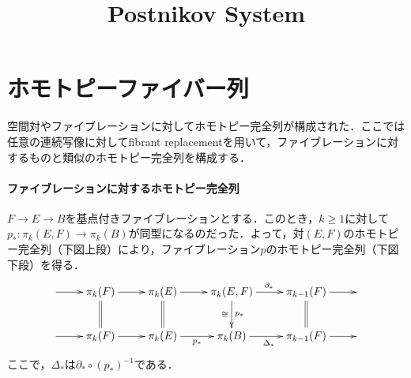 \documentclass[a4paper,11pt]{jsarticle}
\theoremstyle{definition}
\begin{document}
\date{}
\title{Postnikov System}

\maketitle


\tableofcontents

\section{ホモトピーファイバー列}
空間対やファイブレーションに対してホモトピー完全列が構成された．ここでは任意の連続写像に対してfibrant replacementを用いて，ファイブレーションに対するものと類似のホモトピー完全列を構成する．
\paragraph{ファイブレーションに対するホモトピー完全列}
$F\rightarrow E\rightarrow B$を基点付きファイブレーションとする．このとき，$k\ge 1$に対して$p_*\colon \pi_k(E,F)\to \pi_k(B)$が同型になるのだった．よって，対$(E,F)$のホモトピー完全列（下図上段）により，ファイブレーション$p$のホモトピー完全列（下図下段）を得る．
\[\xymatrix{
  \ar[r]&
  \pi_k(F)\ar@{=}[d]\ar[r] &
  \pi_k(E)\ar@{=}[d]\ar[r] &
  \pi_k(E,F)\ar[d]_{\cong}^{p_*}\ar[r]^{\partial_*} &
  \pi_{k-1}(F)\ar@{=}[d]\ar[r]&
  \\
  \ar[r]&
  \pi_k(F)\ar[r] &
  \pi_k(E)\ar[r]_{p_*} &
  \pi_k(B)\ar[r]_{\Delta_*} &
  \pi_{k-1}(F)\ar[r]&
}\]
ここで，$\Delta_*$は$\partial_*\circ (p_*)^{-1}$である．
\end{document}
